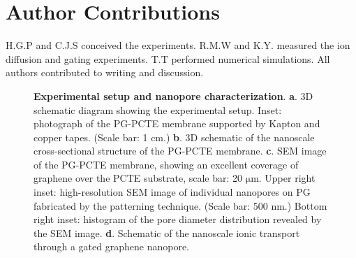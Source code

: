 \section{Author Contributions}
\label{sec:np-author-contrib}

H.G.P and C.J.S conceived the experiments. R.M.W and K.Y. measured the ion
diffusion and gating experiments. T.T performed numerical
simulations. All authors contributed to writing and discussion.



\begin{figure}[H]
  \centering
  \caption{\textbf{Experimental setup and nanopore characterization}.
    \textbf{a}. 3D schematic diagram showing the experimental
    setup. Inset: photograph of the PG-PCTE membrane supported by
    Kapton and copper tapes. (Scale bar: 1 cm.) \textbf{b}. 3D schematic
    of the nanoscale cross-sectional structure of the PG-PCTE
    membrane. \textbf{c}. SEM image of the PG-PCTE membrane, showing an
    excellent coverage of graphene over the PCTE substrate, scale bar:
    20 $\mathrm{\mu}$m.  Upper right inset: high-resolution SEM image
    of individual nanopores on PG fabricated by the patterning
    technique. (Scale bar: 500 nm.) Bottom right inset: histogram of the
    pore diameter distribution revealed by the SEM
    image. \textbf{d}. Schematic of the nanoscale ionic transport
    through a gated graphene nanopore.}
  \label{fig:np-1}
\end{figure}

